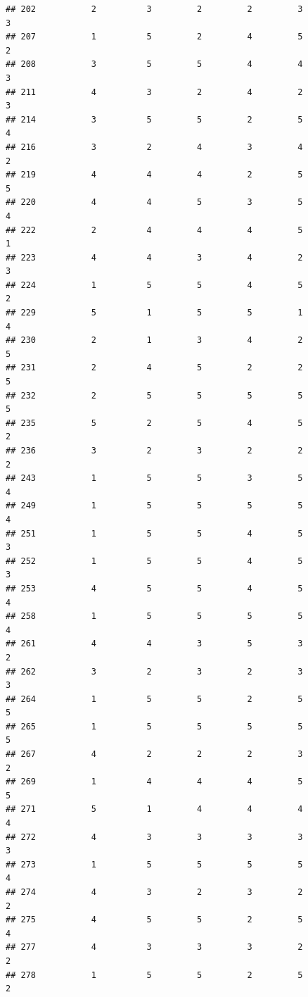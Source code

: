 \documentclass[
]{article}
\begin{document}
\begin{verbatim}
## 202           2          3         2         2         3             3
## 207           1          5         2         4         5             2
## 208           3          5         5         4         4             3
## 211           4          3         2         4         2             3
## 214           3          5         5         2         5             4
## 216           3          2         4         3         4             2
## 219           4          4         4         2         5             5
## 220           4          4         5         3         5             4
## 222           2          4         4         4         5             1
## 223           4          4         3         4         2             3
## 224           1          5         5         4         5             2
## 229           5          1         5         5         1             4
## 230           2          1         3         4         2             5
## 231           2          4         5         2         2             5
## 232           2          5         5         5         5             5
## 235           5          2         5         4         5             2
## 236           3          2         3         2         2             2
## 243           1          5         5         3         5             4
## 249           1          5         5         5         5             4
## 251           1          5         5         4         5             3
## 252           1          5         5         4         5             3
## 253           4          5         5         4         5             4
## 258           1          5         5         5         5             4
## 261           4          4         3         5         3             2
## 262           3          2         3         2         3             3
## 264           1          5         5         2         5             5
## 265           1          5         5         5         5             5
## 267           4          2         2         2         3             2
## 269           1          4         4         4         5             5
## 271           5          1         4         4         4             4
## 272           4          3         3         3         3             3
## 273           1          5         5         5         5             4
## 274           4          3         2         3         2             2
## 275           4          5         5         2         5             4
## 277           4          3         3         3         2             2
## 278           1          5         5         2         5             2

\end{verbatim}
\end{document}
